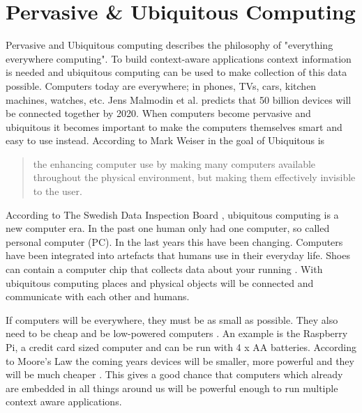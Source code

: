\section{Pervasive \& Ubiquitous Computing}
Pervasive and Ubiquitous computing describes the philosophy of "everything everywhere computing". To build context-aware applications context information is needed and ubiquitous computing can be used to make collection of this data possible.
Computers today are everywhere; in phones, TVs, cars, kitchen machines, watches, etc. Jens Malmodin et al. \cite{fehske2011global} predicts that 50 billion devices will be connected together by 2020. When computers become pervasive and ubiquitous it becomes important to make the computers themselves smart and easy to use instead. According to Mark Weiser in \cite{237456} the goal of Ubiquitous is 

\begin{quotation}
\centering
[...] the enhancing computer use by making many computers available throughout the physical environment, but making them effectively invisible to the user.
\end{quotation}

According to The Swedish Data Inspection Board \cite{datainspect}, ubiquitous computing is a new computer era. In the past one human only had one computer, so called personal computer (PC). In the last years this have been changing. Computers have been integrated into artefacts that humans use in their everyday life. Shoes can contain a computer chip that collects data about your running \cite{saponas2006devices}. With ubiquitous computing places and physical objects will be connected and communicate with each other and humans. 

If computers will be everywhere, they must be as small as possible. They also need to be cheap and be low-powered computers \cite{datainspect}. An example is the Raspberry Pi, a credit card sized computer and can be run with 4 x AA batteries. According to Moore's Law the coming years devices will be smaller, more powerful and they will be much cheaper \cite{591665}. This gives a good chance that computers which already are embedded in all things around us will be powerful enough to run multiple context aware applications.
